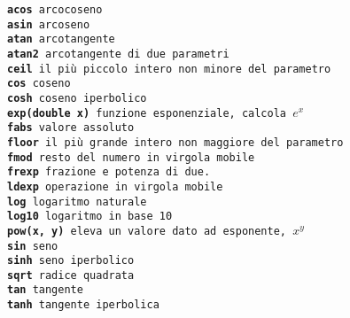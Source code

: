 \documentclass[11pt]{article}
\begin{document}
\begin{mdframed}[backgroundcolor=panna]
\texttt{{\bf acos}	arcocoseno
\\
{\bf asin}	arcoseno
\\
{\bf atan}	arcotangente
\\
{\bf atan2}	arcotangente di due parametri
\\
{\bf ceil}	il più piccolo intero non minore del parametro
\\
{\bf cos}	coseno
\\
{\bf cosh}	coseno iperbolico
\\
{\bf exp(double x)}	funzione esponenziale, calcola $e^x$
\\
{\bf fabs}	valore assoluto
\\
{\bf floor}	il più grande intero non maggiore del parametro
\\
{\bf fmod}	resto del numero in virgola mobile
\\
{\bf frexp}	frazione e potenza di due.
\\
{\bf ldexp}	operazione in virgola mobile
\\
{\bf log}	logaritmo naturale
\\
{\bf log10}	logaritmo in base 10
\\
{\bf pow(x, y)}	eleva un valore dato ad esponente, $x^y$
\\
{\bf sin}	seno
\\
{\bf sinh}	seno iperbolico
\\
{\bf sqrt}	radice quadrata
\\
{\bf tan}       tangente
\\
{\bf tanh}	tangente iperbolica
}
\end{mdframed}
\end{document}
